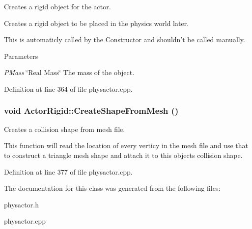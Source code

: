 Creates a rigid object for the actor. 

Creates a rigid object to be placed in the physics world later. \par
 This is automaticly called by the Constructor and shouldn't be called manually. 
\begin{DoxyParams}{Parameters}
\item[{\em PMass}]\char`\"{}Real Mass\char`\"{} The mass of the object. \end{DoxyParams}


Definition at line 364 of file physactor.cpp.

\hypertarget{classActorRigid_a1a1b7ca97c69bb5420a76116c388b3d1}{
\subsubsection[{CreateShapeFromMesh}]{\setlength{\rightskip}{0pt plus 5cm}void ActorRigid::CreateShapeFromMesh ()}}
\label{d5/d10/classActorRigid_a1a1b7ca97c69bb5420a76116c388b3d1}


Creates a collision shape from mesh file. 

This function will read the location of every verticy in the mesh file and use that to construct a triangle mesh shape and attach it to this objects collision shape. 

Definition at line 377 of file physactor.cpp.



The documentation for this class was generated from the following files:\begin{DoxyCompactItemize}
\item 
physactor.h\item 
physactor.cpp\end{DoxyCompactItemize}
